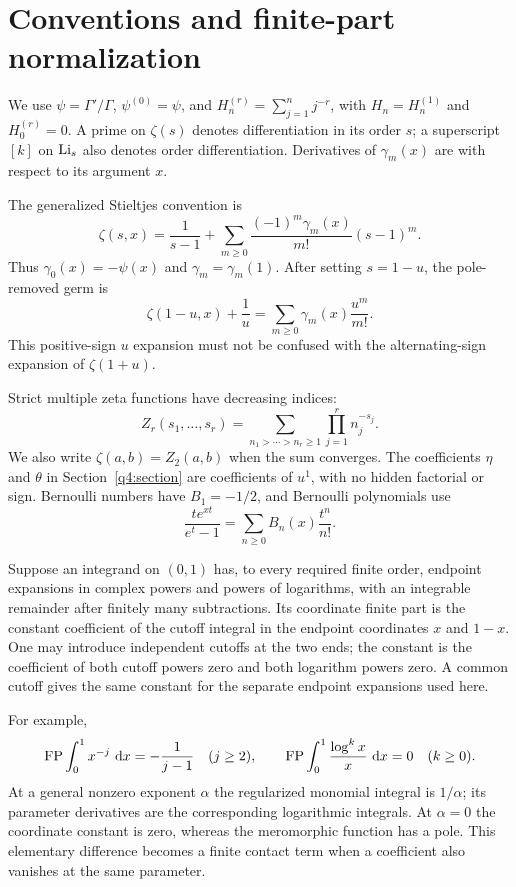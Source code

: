 \section{Conventions and finite-part normalization}
\label{conv:section}

We use $\psi=\Gamma'/\Gamma$, $\psi^{(0)}=\psi$, and
$H_n^{(r)}=\sum_{j=1}^n j^{-r}$, with $H_n=H_n^{(1)}$ and
$H_0^{(r)}=0$. A prime on $\zeta(s)$ denotes differentiation
in its order $s$; a superscript $[k]$ on $\operatorname{Li}_s$ also denotes
order differentiation. Derivatives of $\gamma_m(x)$ are with
respect to its argument $x$.

The generalized Stieltjes convention is
\begin{equation}\label{conv:stieltjes}
\zeta(s,x)=\frac1{s-1}+
\sum_{m\ge0}\frac{(-1)^m\gamma_m(x)}{m!}(s-1)^m.
\end{equation}
Thus $\gamma_0(x)=-\psi(x)$ and
$\gamma_m=\gamma_m(1)$. After setting $s=1-u$, the pole-removed
germ is
\[
\zeta(1-u,x)+\frac1u
=\sum_{m\ge0}\gamma_m(x)\frac{u^m}{m!}.
\]
This positive-sign $u$ expansion must not be confused with the
alternating-sign expansion of $\zeta(1+u)$.

Strict multiple zeta functions have decreasing indices:
\[
Z_r(s_1,\ldots,s_r)=
\sum_{n_1>\cdots>n_r\ge1}\prod_{j=1}^r n_j^{-s_j}.
\]
We also write $\zeta(a,b)=Z_2(a,b)$ when the sum converges.
The coefficients $\eta$ and $\theta$ in Section~\ref{q4:section}
are coefficients of $u^1$, with no hidden factorial or sign.
Bernoulli numbers have $B_1=-1/2$, and Bernoulli polynomials use
\[
\frac{te^{xt}}{e^t-1}=\sum_{n\ge0}B_n(x)\frac{t^n}{n!}.
\]

\begin{definition}
Suppose an integrand on $(0,1)$ has, to every required finite order,
endpoint expansions in complex powers and powers of logarithms,
with an integrable remainder after finitely many subtractions.
Its coordinate finite part is the constant coefficient of the
cutoff integral in the endpoint coordinates $x$ and $1-x$.
One may introduce independent cutoffs at the two ends; the
constant is the coefficient of both cutoff powers zero and both
logarithm powers zero. A common cutoff gives the same constant
for the separate endpoint expansions used here.
\end{definition}

For example,
\[
\operatorname{FP}\int_0^1x^{-j}\,\mathop{}\!\mathrm{d} x=-\frac1{j-1}\quad(j\ge2),
\qquad
\operatorname{FP}\int_0^1\frac{\log^k x}{x}\,\mathop{}\!\mathrm{d} x=0\quad(k\ge0).
\]
At a general nonzero exponent $\alpha$ the regularized monomial
integral is $1/\alpha$; its parameter derivatives are the
corresponding logarithmic integrals. At $\alpha=0$ the coordinate
constant is zero, whereas the meromorphic function has a pole.
This elementary difference becomes a finite contact term when a
coefficient also vanishes at the same parameter.

